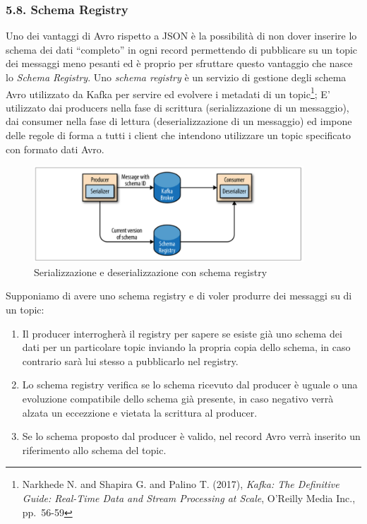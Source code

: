 \documentclass[]{article}
\providecommand{\tightlist}{%
  \setlength{\itemsep}{0pt}\setlength{\parskip}{0pt}}
\begin{document}
\newpage

\subsubsection{5.8. Schema Registry}\label{schema-registry}

Uno dei vantaggi di Avro rispetto a JSON è la possibilità di non dover
inserire lo schema dei dati ``completo'' in ogni record permettendo di
pubblicare su un topic dei messaggi meno pesanti ed è proprio per
sfruttare questo vantaggio che nasce lo \emph{Schema Registry}. Uno
\emph{schema registry} è un servizio di gestione degli schema Avro
utilizzato da Kafka per servire ed evolvere i metadati di un
topic\footnote{Narkhede N. and Shapira G. and Palino T. (2017),
  \emph{Kafka: The Definitive Guide: Real-Time Data and Stream
  Processing at Scale}, O'Reilly Media Inc., pp.~56-59}; E' utilizzato
dai producers nella fase di scrittura (serializzazione di un messaggio),
dai consumer nella fase di lettura (deserializzazione di un messaggio)
ed impone delle regole di forma a tutti i client che intendono
utilizzare un topic specificato con formato dati Avro.

\begin{figure}
\centering
\includegraphics[width=0.90000\textwidth]{../images/schema-registry.png}
\caption{Serializzazione e deserializzazione con schema registry
\label{figure_5}}
\end{figure}

Supponiamo di avere uno schema registry e di voler produrre dei messaggi
su di un topic:

\begin{enumerate}
\def\labelenumi{\arabic{enumi}.}
\tightlist
\item
  Il producer interrogherà il registry per sapere se esiste già uno
  schema dei dati per un particolare topic inviando la propria copia
  dello schema, in caso contrario sarà lui stesso a pubblicarlo nel
  registry.
\item
  Lo schema registry verifica se lo schema ricevuto dal producer è
  uguale o una evoluzione compatibile dello schema già presente, in caso
  negativo verrà alzata un eccezzione e vietata la scrittura al
  producer.
\item
  Se lo schema proposto dal producer è valido, nel record Avro verrà
  inserito un riferimento allo schema del topic.
\end{enumerate}
\end{document}
